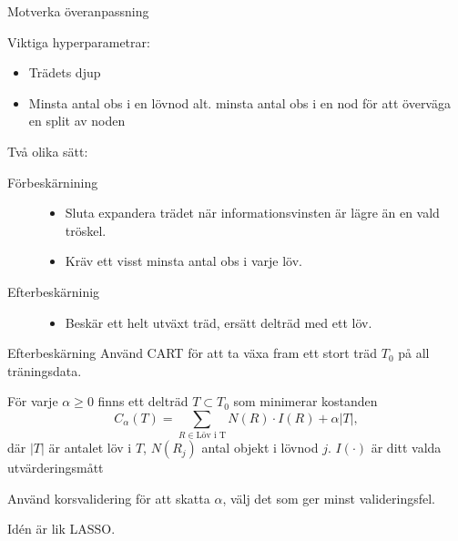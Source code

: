 \documentclass[10pt,english]{beamer}
\begin{document}
\begin{frame}{Motverka överanpassning}

    Viktiga hyperparametrar:
    \begin{itemize}
      \item Trädets djup
      \item Minsta antal obs i en lövnod alt. minsta antal obs i en nod för att överväga en split av noden
    \end{itemize}

    Två olika sätt:
    \begin{description}
        \item[Förbeskärnining]
        \begin{itemize}
            \item Sluta expandera trädet när informationsvinsten är lägre än en vald tröskel.
            \item Kräv ett visst minsta antal obs i varje löv.
        \end{itemize}
        \item[Efterbeskärninig]
        \begin{itemize}
            \item Beskär ett helt utväxt träd, ersätt delträd med ett löv.
        \end{itemize}
    \end{description}
    
\end{frame}



\begin{frame}{Efterbeskärning}
    Använd CART för att ta växa fram ett stort träd $T_0$ på all träningsdata.

    För varje $\alpha \geq 0$ finns ett delträd $T \subset T_0$ som minimerar kostanden
    \begin{equation*}
        C_{\alpha}(T) = \sum_{R \in \text{Löv i T}} N(R) \cdot I(R) + \alpha |T|,
    \end{equation*} 
    där $|T|$ är antalet löv i $T$, $N(R_j)$ antal objekt i lövnod $j$. $I(\cdot)$ 
    är ditt valda utvärderingsmått

    Använd korsvalidering för att skatta $\alpha$, välj det som ger minst valideringsfel.

    Idén är lik LASSO.
\end{frame}
\end{document}

